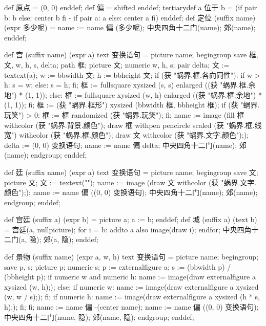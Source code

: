 \startMPinclusions[+]
def 原点 = (0, 0) enddef;
def 偏 = shifted enddef;
tertiarydef a 位于 b =
  (if pair b: b else: center b fi - if pair a: a else: center a fi)
enddef;
def 定位 (suffix name) (expr 多少呢) =
  name := name 偏 (多少呢);
  中央四角十二门(name); 郊(name);
enddef;
\stopMPinclusions

\startMPinclusions[+]
def 宫 (suffix name) (expr a) text 变换语句 =
  picture name;
  begingroup
  save 框, 文, w, h, s, delta;
  path 框; picture 文; numeric w, h, s; pair delta;
  文 := textext(a);
  w := bbwidth 文; h := bbheight 文;
  if (获 "蜗界.框.各向同性"):
    if w > h: s = w; else: s = h; fi;
    框 := fullsquare xysized (s, s) enlarged ((获 "蜗界.框.余地") * (1, 1));
  else:
    框 := fullsquare xysized (w, h) enlarged ((获 "蜗界.框.余地") * (1, 1));
  fi;
  框 := (获 "蜗界.框形") xysized (bbwidth 框, bbheight 框);
  if (获 "蜗界.玩笑") > 0: 框 := 框 randomized (获 "蜗界.玩笑"); fi;
  name := image (fill 框 withcolor (获 "蜗界.背景.颜色");
                 draw 框 withpen pencircle scaled (获 "蜗界.框.线宽")
                         withcolor (获 "蜗界.框.颜色");
                 draw 文 withcolor (获 "蜗界.文字.颜色"););
  delta := (0, 0) 变换语句;
  name := name 偏 delta;
  中央四角十二门(name); 郊(name);
  endgroup;
enddef;
\stopMPinclusions

\startMPinclusions[+]
def 廷 (suffix name) (expr a) text 变换语句 =
  picture name;
  begingroup
    save 文; picture 文; 文 := textext("");
    name := image (draw 文 withcolor (获 "蜗界.文字.颜色"););
    name := name 偏 ((0, 0) 变换语句); 中央四角十二门(name); 郊(name);
  endgroup;
enddef;
\stopMPinclusions

\startMPinclusions[+]
def 宫廷 (suffix a) (expr b) = picture a; a := b; enddef;
def 城 (suffix a) (text b) =
  宫廷(a, nullpicture);
  for i = b: addto a also image(draw i); endfor;
  中央四角十二门(a, 隐); 郊(a, 隐);
enddef;
\stopMPinclusions

\startMPinclusions[+]
def 景物 (suffix name) (expr a, w, h) text 变换语句 =
  picture name;
  begingroup;
  save p, s; picture p; numeric s;
  p := externalfigure a;
  s := (bbwidth p) / (bbheight p);
  if numeric w and numeric h:
    name := image(draw externalfigure a xysized (w, h););
  else:
    if numeric w:
      name := image(draw externalfigure a xysized (w, w / s););
    fi;
    if numeric h:
       name := image(draw externalfigure a xysized (h * s, h););
    fi;
  fi;
  name := name 偏 -(center name); %
  name := name 偏 ((0, 0) 变换语句); 
  中央四角十二门(name, 隐); 郊(name, 隐);
  endgroup;
enddef;

